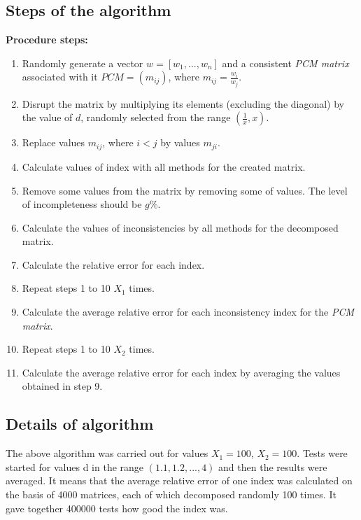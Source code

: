 \subsection{Steps of the algorithm}
\textbf{Procedure steps:}
\begin{enumerate}
\item Randomly generate a vector $w=[w_{1},...,w_{n}]$ and a consistent \textit{PCM matrix} associated with it $PCM=\left(m_{ij}\right)$, where $m_{ij}=\frac{w_{i}}{w_{j}}$.
\item Disrupt the matrix by multiplying its elements (excluding the diagonal) by the value of $d$, randomly selected from the range $\left(\frac{1}{x},x\right)$.
\item Replace values $m_{ij}$, where $i<j$ by values $m_{ji}$.

\item Calculate values of index with all methods for the created matrix.

\item Remove some values from the matrix by removing some of values. The level of incompleteness should be $g$\%.

\item Calculate the values of inconsistencies by all methods for the decomposed matrix.

\item Calculate the relative error for each index.

\item Repeat steps 1 to 10 $X_{1}$ times.

\item Calculate the average relative error for each inconsistency index for the \textit{PCM matrix}.

\item Repeat steps 1 to 10 $X_{2}$ times.

\item Calculate the average relative error for each index by averaging the values obtained in step 9.

\end{enumerate}


\subsection{Details of algorithm}
The above algorithm was carried out for values $X_{1}=100$, $X_{2}=100$. Tests were started for values d in the range $\left(1.1,1.2,...,4\right)$ and then the results were averaged. It means that the average relative error of one index was calculated on the basis of 4000 matrices, each of which decomposed randomly 100 times. It gave together 400000 tests how good the index was. 
\\

